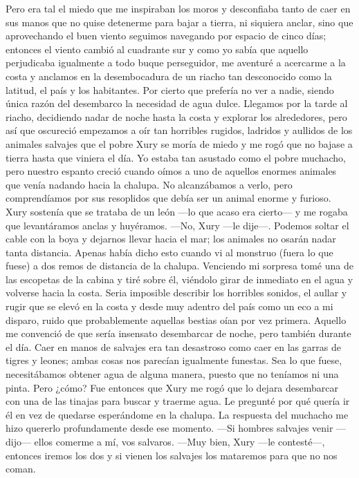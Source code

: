 \documentclass{novela}
\begin{document}
    Pero era tal el miedo que me inspiraban los moros y desconfiaba tanto de caer en sus manos que no quise detenerme para bajar a tierra, ni siquiera anclar, sino que aprovechando el buen viento seguimos navegando por espacio de cinco días; entonces el viento cambió al cuadrante sur y como yo sabía que aquello perjudicaba igualmente a todo buque perseguidor, me aventuré a acercarme a la costa y anclamos en la desembocadura de un riacho tan desconocido como la latitud, el país y los habitantes. Por cierto que prefería no ver a nadie, siendo única razón del desembarco la necesidad de agua dulce. Llegamos por la tarde al riacho, decidiendo nadar de noche hasta la costa y explorar los alrededores, pero así que oscureció empezamos a oír tan horribles rugidos, ladridos y aullidos de los animales salvajes que el pobre Xury se moría de miedo y me rogó que no bajase a tierra hasta que viniera el día.
    Yo estaba tan asustado como el pobre muchacho, pero nuestro espanto creció cuando oímos a uno de aquellos enormes animales que venía nadando hacia la chalupa. No alcanzábamos a verlo, pero comprendíamos por sus resoplidos que debía ser un animal enorme y furioso. Xury sostenía que se trataba de un león —lo que acaso era cierto— y me rogaba que levantáramos anclas y huyéramos.
    —No, Xury —le dije—. Podemos soltar el cable con la boya y dejarnos llevar hacia el mar; los animales no osarán nadar tanta distancia.
    Apenas había dicho esto cuando vi al monstruo (fuera lo que fuese) a dos remos de distancia de la chalupa. Venciendo mi sorpresa tomé una de las escopetas de la cabina y tiré sobre él, viéndolo girar de inmediato en el agua y volverse hacia la costa.
    Seria imposible describir los horribles sonidos, el aullar y rugir que se elevó en la costa y desde muy adentro del país como un eco a mi disparo, ruido que probablemente aquellas bestias oían por vez primera. Aquello me convenció de que sería insensato desembarcar de noche, pero también durante el día. Caer en manos de salvajes era tan desastroso como caer en las garras de tigres y leones; ambas cosas nos parecían igualmente funestas.
    Sea lo que fuese, necesitábamos obtener agua de alguna manera, puesto que no teníamos ni una pinta. Pero ¿cómo? Fue entonces que Xury me rogó que lo dejara desembarcar con una de las tinajas para buscar y traerme agua. Le pregunté por qué quería ir él en vez de quedarse esperándome en la chalupa. La respuesta del muchacho me hizo quererlo profundamente desde ese momento.
    —Si hombres salvajes venir —dijo— ellos comerme a mí, vos salvaros.
    —Muy bien, Xury —le contesté—, entonces iremos los dos y si vienen los salvajes los mataremos para que no nos coman.
\end{document}

